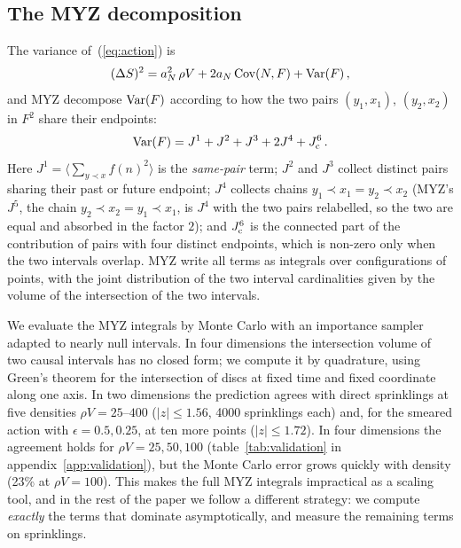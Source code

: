 \documentclass{iopjournal}
\newcommand{\eref}[1]{(\ref{#1})}
\newcommand{\tref}[1]{table~\ref{#1}}
\newcommand{\rhoV}{\rho V}
\newcommand{\Jone}{J^{1}}
\begin{document}
\subsection{The MYZ decomposition}

The variance of~\eref{eq:action} is
\begin{equation}
(\Delta S)^2=a_N^2\,\rhoV+2a_N\,{\rm Cov}(N,F)+{\rm Var}(F)\,,
\label{eq:var}
\end{equation}
and MYZ decompose ${\rm Var}(F)$ according to how the two pairs
$(y_1,x_1)$, $(y_2,x_2)$ in $F^2$ share their endpoints:
\begin{equation}
{\rm Var}(F)=\Jone+J^2+J^3+2J^4+J^6_{\rm c}\,.
\label{eq:myz}
\end{equation}
Here $\Jone=\langle\sum_{y\prec x}f(n)^2\rangle$ is the \emph{same-pair} term;
$J^2$ and $J^3$ collect distinct pairs sharing their past or future endpoint;
$J^4$ collects chains $y_1\prec x_1=y_2\prec x_2$ (MYZ's $J^5$, the chain
$y_2\prec x_2=y_1\prec x_1$, is $J^4$ with the two pairs relabelled, so the two
are equal and absorbed in the factor $2$); and $J^6_{\rm c}$ is the
connected part of the contribution of pairs with four distinct endpoints,
which is non-zero only when the two intervals overlap. MYZ write all terms as
integrals over configurations of points, with the joint distribution of the
two interval cardinalities given by the volume of the intersection of the two
intervals.

We evaluate the MYZ integrals by Monte Carlo with an importance sampler
adapted to nearly null intervals. In four dimensions the intersection volume
of two causal intervals has no closed form; we compute it by quadrature,
using Green's theorem for the intersection of discs at fixed time and fixed
coordinate along one axis. In two dimensions the prediction agrees with
direct sprinklings at five densities $\rhoV=25$--$400$ ($|z|\le1.56$, 4000
sprinklings each) and, for the smeared action with $\epsilon=0.5,0.25$, at ten
more points ($|z|\le1.72$). In four dimensions the agreement holds for
$\rhoV=25,50,100$ (\tref{tab:validation} in appendix~\ref{app:validation}), but the Monte Carlo error grows quickly with density
(23\% at $\rhoV=100$). This makes the full MYZ integrals impractical as a
scaling tool, and in the rest of the paper we follow a different strategy:
we compute \emph{exactly} the terms that dominate asymptotically, and measure
the remaining terms on sprinklings.

\end{document}

